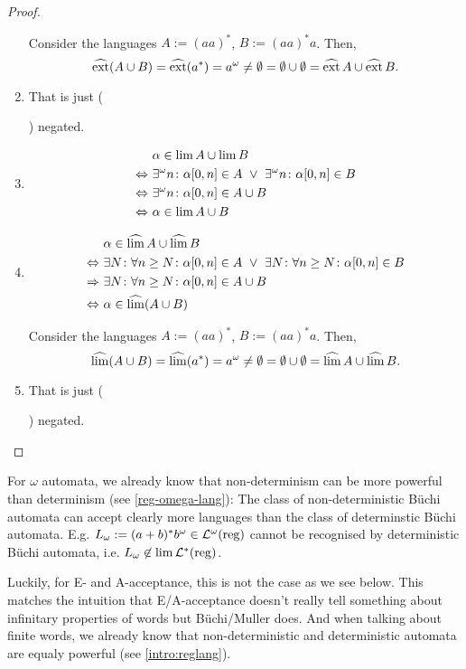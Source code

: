 \begin{lemma}
\begin{proof}
\begin{enumerate}
Consider the languages $A := (aa)^*$, $B := (aa)^*a$. Then,
\[ \operatorname{\widehat{ext}}(A \cup B) = \operatorname{\widehat{ext}}(a^*) = a^\omega \ne \emptyset = \emptyset \cup \emptyset = \operatorname{\widehat{ext}} A \cup \operatorname{\widehat{ext}} B . \]
\item That is just (\addtocounter{enumi}{-1}\addtocounter{enumi}{+1}) negated.
\item %
\begin{align*}
& \alpha \in \lim A \cup \lim B \\
\Leftrightarrow \ & \existsinf n \colon \alpha[0,n] \in A \ \vee \ \existsinf n \colon \alpha[0,n] \in B \\
\Leftrightarrow \ & \existsinf n \colon \alpha[0,n] \in A \cup B \\
\Leftrightarrow \ & \alpha \in \lim A \cup B
\end{align*}

\item %
\begin{align*}
& \alpha \in \dlim A \cup \dlim B \\
\Leftrightarrow \ & \exists N \colon \forall n \ge N \colon \alpha[0,n] \in A \ \vee \ 
\exists N \colon \forall n \ge N \colon \alpha[0,n] \in B \\
\Rightarrow \ & \exists N \colon \forall n \ge N \colon \alpha[0,n] \in A \cup B \\
\Leftrightarrow \ & \alpha \in \dlim (A \cup B)
\end{align*}

Consider the languages $A := (aa)^*$, $B := (aa)^*a$. Then,
\[ \operatorname{\widehat{lim}}(A \cup B) = \operatorname{\widehat{lim}}(a^*) = a^\omega \ne \emptyset = \emptyset \cup \emptyset = \operatorname{\widehat{lim}} A \cup \operatorname{\widehat{lim}} B . \]

\item That is just (\addtocounter{enumi}{-1}\addtocounter{enumi}{+1}) negated.
\end{enumerate}
\end{proof}
\end{lemma}

For $\omega$ automata, we already know that non-determinism can be more powerful than determinism (see \cref{reg-omega-lang}): The class of non-deterministic Büchi automata can accept clearly more languages than the class of determinstic Büchi automata. E.g. $L_\omega := (a+b)^* b^\omega \in \mathcal{L}^\omega(\textup{\textrm{reg}})$ cannot be recognised by deterministic Büchi automata, i.e. $L_\omega \not\in \lim \mathcal{L}^*(\textup{\textrm{reg}})$.

Luckily, for E- and A-acceptance, this is not the case as we see below. This matches the intuition that E/A-acceptance doesn't really tell something about infinitary properties of words but Büchi/Muller does. And when talking about finite words, we already know that non-deterministic and deterministic automata are equaly powerful (see \cref{intro:reglang}).

